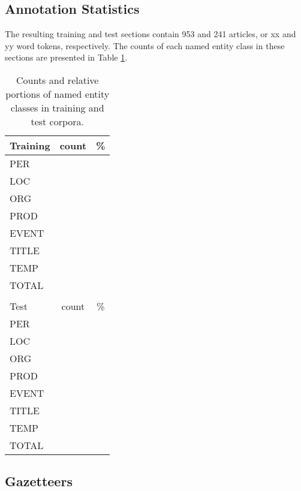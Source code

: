 \documentclass[11pt]{article}
\begin{document}


\subsection{Annotation Statistics}

The resulting training and test sections contain 953 and 241 articles, or xx and yy word tokens, respectively. The counts of each named entity class in these sections are presented in Table \ref{tab: statistics}.


\begin{table}[h!]
\begin{center}
\begin{tabular}{lcc} 
\hline
\noalign{\smallskip}
Training & count & \% \\ 
\hline
\noalign{\smallskip}
PER & & \\
LOC & &  \\
ORG & & \\
PROD & & \\
EVENT & & \\
TITLE & & \\
TEMP & & \\
\hline
\noalign{\smallskip}
TOTAL & & \\
& & \\
\hline
\noalign{\smallskip}
Test & count & \% \\ 
\hline
\noalign{\smallskip}
PER & & \\
LOC & &  \\
ORG & & \\
PROD & & \\
EVENT & & \\
TITLE & & \\
TEMP & & \\
\hline
\noalign{\smallskip}
TOTAL & & \\\end{tabular}
\end{center}
\caption{Counts and relative portions of named entity classes in training and test corpora.}
\label{tab: statistics} 
\end{table}


\subsection{Gazetteers}
\end{document}
